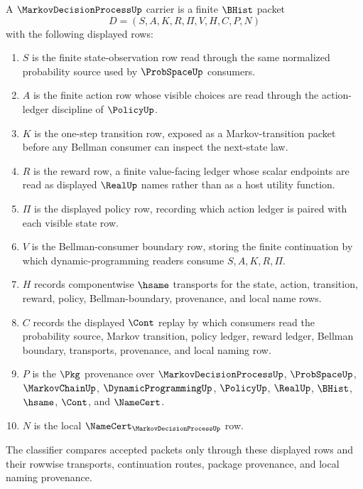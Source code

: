 \begin{definition}
\label{def:markov-decision-process-carrier}
A $\MarkovDecisionProcessUp$ carrier is a finite $\BHist$ packet
$$
D=(S,A,K,R,\Pi,V,H,C,P,N)
$$
with the following displayed rows:
\begin{enumerate}
\item $S$ is the finite state-observation row read through the same normalized probability source used by $\ProbSpaceUp$ consumers.
\item $A$ is the finite action row whose visible choices are read through the action-ledger discipline of $\PolicyUp$.
\item $K$ is the one-step transition row, exposed as a Markov-transition packet before any Bellman consumer can inspect the next-state law.
\item $R$ is the reward row, a finite value-facing ledger whose scalar endpoints are read as displayed $\RealUp$ names rather than as a host utility function.
\item $\Pi$ is the displayed policy row, recording which action ledger is paired with each visible state row.
\item $V$ is the Bellman-consumer boundary row, storing the finite continuation by which dynamic-programming readers consume $S,A,K,R,\Pi$.
\item $H$ records componentwise $\hsame$ transports for the state, action, transition, reward, policy, Bellman-boundary, provenance, and local name rows.
\item $C$ records the displayed $\Cont$ replay by which consumers read the probability source, Markov transition, policy ledger, reward ledger, Bellman boundary, transports, provenance, and local naming row.
\item $P$ is the $\Pkg$ provenance over $\MarkovDecisionProcessUp$, $\ProbSpaceUp$, $\MarkovChainUp$, $\DynamicProgrammingUp$, $\PolicyUp$, $\RealUp$, $\BHist$, $\hsame$, $\Cont$, and $\NameCert$.
\item $N$ is the local $\NameCert_{\MarkovDecisionProcessUp}$ row.
\end{enumerate}
The classifier compares accepted packets only through these displayed rows and their rowwise transports, continuation routes, package provenance, and local naming provenance.
\end{definition}

